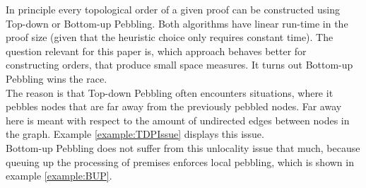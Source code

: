 \documentclass{llncs}
\begin{document}
\label{sec:TDvsBU}

In principle every topological order of a given proof can be constructed using Top-down or Bottom-up Pebbling.
Both algorithms have linear run-time in the proof size (given that the heuristic choice only requires constant time). 
The question relevant for this paper is, which approach behaves better for constructing orders, that produce small space measures.
It turns out Bottom-up Pebbling wins the race.\\
The reason is that Top-down Pebbling often encounters situations, where it pebbles nodes that are far away from the previously pebbled nodes.
Far away here is meant with respect to the amount of undirected edges between nodes in the graph. Example \ref{example:TDPIssue} displays this issue.\\
Bottom-up Pebbling does not suffer from this unlocality issue that much, because queuing up the processing of premises enforces local pebbling, which is shown in example \ref{example:BUP}.
\end{document}
